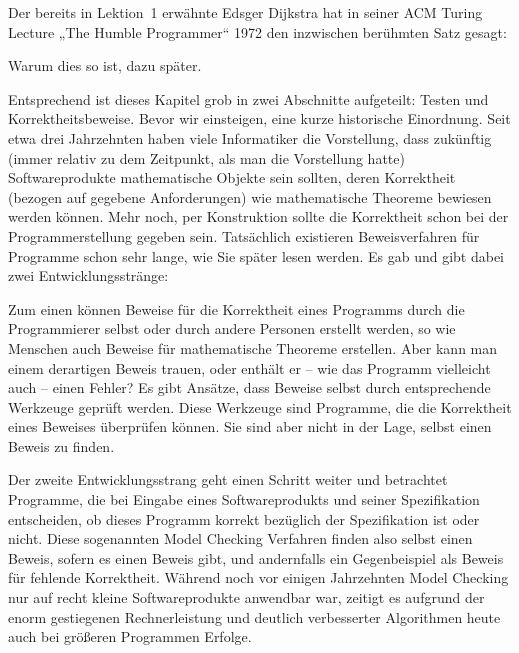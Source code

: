 \vspace{2mm} %

Der bereits in Lektion~1 %
erwähnte Edsger Dijkstra hat in seiner ACM Turing Lecture „The Humble Programmer“ 1972 den inzwischen berühmten Satz gesagt: 

\vspace{2.6mm} %


\vspace{2.6mm} %

Warum dies so ist, dazu später.

\vspace{0.4mm} %

Entsprechend ist dieses Kapitel grob in zwei Abschnitte aufgeteilt: Testen und Korrektheits\-beweise. Bevor wir einsteigen, eine kurze historische Einordnung. Seit etwa drei Jahrzehnten haben viele Informatiker die Vorstellung, dass zukünftig (immer relativ zu dem Zeitpunkt, als man die Vorstellung hatte) Softwareprodukte mathematische Objekte sein sollten, deren Korrektheit (bezogen auf gegebene Anforderungen) wie mathematische Theoreme bewiesen werden können. Mehr noch, per Konstruktion sollte die Korrektheit schon bei der Programmerstellung gegeben sein. Tatsächlich existieren Beweisverfahren für Programme schon sehr lange, wie Sie später lesen werden. Es gab und gibt dabei zwei Entwicklungsstränge:

Zum einen können Beweise für die Korrektheit eines Programms durch die Programmierer selbst oder durch andere Personen erstellt werden, so wie Menschen auch Beweise für mathematische Theoreme erstellen. Aber kann man einem der\-artigen Beweis trauen, oder enthält er – wie das Programm vielleicht auch – einen Fehler? Es gibt Ansätze, dass Beweise selbst durch entsprechende Werkzeuge geprüft werden. Diese Werkzeuge sind Programme, die die Korrektheit eines Beweises überprüfen können. Sie sind aber nicht in der Lage, selbst einen Beweis zu finden.

Der zweite Entwicklungsstrang geht einen Schritt weiter und betrachtet Programme, die bei Eingabe eines Softwareprodukts und seiner Spezifikation entscheiden, ob dieses Programm korrekt bezüglich der Spezifikation ist oder nicht. Diese sogenannten Model Checking Verfahren finden also selbst einen Beweis, sofern es einen Beweis gibt, und andernfalls ein Gegenbeispiel als Beweis für fehlende Korrektheit. Während noch vor einigen Jahrzehnten Model Checking nur auf recht kleine Software\-produkte anwendbar war, zeitigt es aufgrund der enorm gestiegenen Rechnerleistung und deutlich verbesserter Algorithmen heute auch bei größeren Programmen Erfolge.

